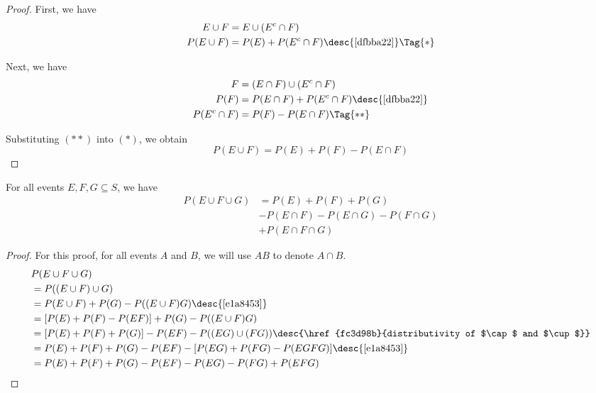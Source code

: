 \begin{proof}
  First, we have
  \begin{align*}
    E\cup F    &= E\cup(E^c\cap F)                                 \\
    P(E\cup F) &= P(E)+P(E^c\cap F)\desc{\autoref{dfbba22}}\Tag{*}
  \end{align*}

  Next, we have
  \begin{align*}
    F            &= (E\cap F)\cup(E^c\cap F)                        \\
    P(F)         &= P(E\cap F)+P(E^c\cap F)\desc{\autoref{dfbba22}} \\
    P(E^c\cap F) &= P(F)-P(E\cap F)\Tag{**}
  \end{align*}

  Substituting $(**)$ into $(*)$, we obtain
  $$
    P(E\cup F)=P(E)+P(F)-P(E\cap F)
  $$
\end{proof}

\label{e764524}

For all events $E,F,G\subseteq S$, we have
\begin{align*}
  P(E\cup F\cup G) &= P(E)+P(F)+P(G)                  \\
                   &-P(E\cap F)-P(E\cap G)-P(F\cap G) \\
                   &+P(E\cap F\cap G)
\end{align*}

\begin{proof}
  For this proof, for all events $A$ and $B$, we will use $AB$ to denote $A\cap
  B$.
  \begin{align*}
     &P(E\cup F\cup G)                                                                                  \\
     &=P((E\cup F)\cup G)                                                                               \\
     &=P(E\cup F)+P(G)-P((E\cup F)G)\desc{\autoref{e1a8453}}                                            \\
     &=[P(E)+P(F)-P(EF)]+P(G)-P((E\cup F)G)                                                             \\
     &=[P(E)+P(F)+P(G)]-P(EF)-P((EG)\cup(FG))\desc{\href{fc3d98b}{distributivity of $\cap$ and $\cup$}} \\
     &=P(E)+P(F)+P(G)-P(EF)-[P(EG)+P(FG)-P(EGFG)]\desc{\autoref{e1a8453}}                               \\
     &=P(E)+P(F)+P(G)-P(EF)-P(EG)-P(FG)+P(EFG)
  \end{align*}
\end{proof}

